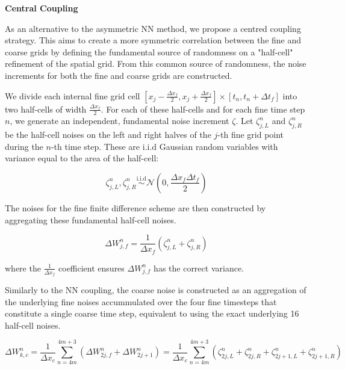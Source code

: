 \textbf{Central Coupling}

As an alternative to the asymmetric NN method, we
propose a centred coupling strategy. This aims 
to create a more symmetric correlation between the fine 
and coarse grids by defining the fundamental source 
of randomness on a "half-cell" refinement of the 
spatial grid. From this common source of randomness, 
the noise increments for both the fine and coarse 
grids are constructed. 

We divide each internal fine grid cell 
$[x_{j}-\frac{\Delta x_f}{2}, 
x_{j}+\frac{\Delta x_f}{2}]
\times [t_n, t_n + \Delta t_f]$ into
two half-cells of width $\frac{\Delta x_f}{2}$.
For each of these half-cells and for each fine time
step $n$, we generate an independent, fundamental 
noise increment $\zeta$. Let $\zeta_{j,L}^n$ and 
$\zeta_{j,R}^n$ be the half-cell noises on the left 
and right halves of the $j$-th fine grid point
during the $n$-th time step. These are 
i.i.d Gaussian random variables with variance 
equal to the area of the half-cell:

\begin{equation*}
    \zeta_{j,L}^n, \zeta_{j, R}^n 
    \overset{\mathrm{i.i.d}}{\sim} 
    \mathcal{N}(0, \frac{\Delta x_f \Delta t_f}{2})
\end{equation*}

The noises for the fine finite difference 
scheme are then constructed by aggregating 
these fundamental half-cell noises.

\begin{equation*}
    \Delta W_{j,f}^n = \frac{1}{\Delta x_f} 
    (\zeta_{j,L}^n + \zeta_{j,R}^n)
\end{equation*}

where the $\frac{1}{\Delta x_f}$ coefficient 
ensures $\Delta W_{j,f}^n$ has the correct variance. 

Similarly to the NN coupling, the coarse noise 
is constructed as an aggregation of 
the underlying fine noises accummulated over the
four fine timesteps that constitute a single
coarse time step, equivalent to using the 
exact underlying 16 half-cell noises.

\begin{equation*}
    \Delta W_{k, c}^n = \frac{1}{\Delta x_c}
    \sum_{n=4m}^{4m+3} \left(\Delta W_{2j,f}^n + 
    \Delta W_{2j+1}^n\right) = \frac{1}{\Delta x_c}
    \sum_{n=4m}^{4m+3} \left(\zeta_{2j,L}^n + 
    \zeta_{2j, R}^n + \zeta_{2j+1,L}^n + 
    \zeta_{2j+1,R}^n\right)
\end{equation*}

